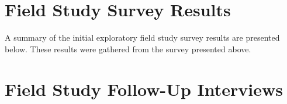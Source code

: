 \begin{center}
\end{center}

\chapter{Field Study Survey Results}
\label{appendix:field-study-survey-results}

A summary of the initial exploratory field study survey results are presented below. These results were gathered from the survey presented above.


\chapter{Field Study Follow-Up Interviews}
\label{appendix:field-study-follow-up-interviews}


